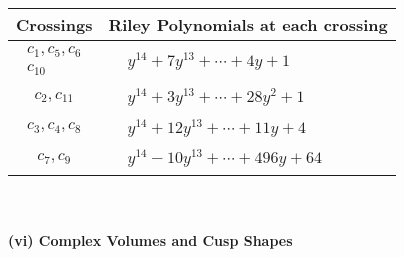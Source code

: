 \documentclass[1p]{elsarticle_modified}
\theoremstyle{definition}
\begin{document}
\begin{tabular}{m{50pt}|m{274pt}}
Crossings & \hspace{64pt}Riley Polynomials at each crossing \\
\hline $$\begin{aligned}c_{1},c_{5},c_{6}\\c_{10}\end{aligned}$$&$\begin{aligned}
&y^{14}+7 y^{13}+\cdots+4 y+1
\end{aligned}$\\
\hline $$\begin{aligned}c_{2},c_{11}\end{aligned}$$&$\begin{aligned}
&y^{14}+3 y^{13}+\cdots+28 y^2+1
\end{aligned}$\\
\hline $$\begin{aligned}c_{3},c_{4},c_{8}\end{aligned}$$&$\begin{aligned}
&y^{14}+12 y^{13}+\cdots+11 y+4
\end{aligned}$\\
\hline $$\begin{aligned}c_{7},c_{9}\end{aligned}$$&$\begin{aligned}
&y^{14}-10 y^{13}+\cdots+496 y+64
\end{aligned}$\\
\hline
\end{tabular}\\~\\
\newpage\flushleft \textbf{(vi) Complex Volumes and Cusp Shapes}
\end{document}
